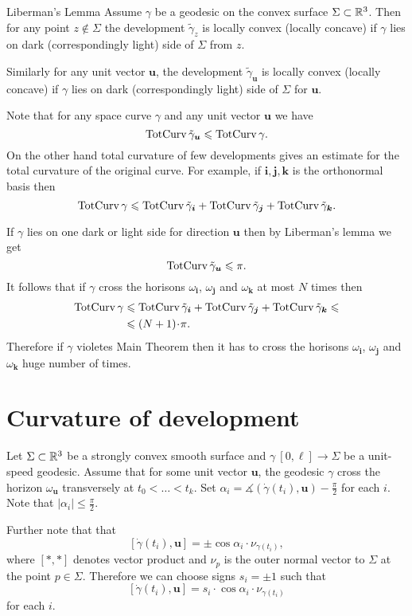 \documentclass[a4paper,10pt]{amsart}
\begin{document}
\begin{thm}{Liberman's Lemma}\label{lem:liberman}
Assume $\gamma$ be a geodesic on the convex surface $\Sigma\subset \mathbb{R}^3$.
Then for any point $z\notin\Sigma$ the development $\tilde\gamma_z$ is locally convex (locally concave) if $\gamma$ lies on dark (correspondingly light) side of $\Sigma$ from $z$.

Similarly for any unit vector $\bm{u}$,
the development $\tilde\gamma_{\bm{u}}$ is locally convex (locally concave) if $\gamma$ lies on dark (correspondingly light) side of $\Sigma$ for $\bm{u}$.

\end{thm}

Note that for any space curve $\gamma$ and any unit vector $\bm{u}$
we have 
\[\mathop{\rm TotCurv}\nolimits\tilde\gamma_{\bm{u}}\leqslant\mathop{\rm TotCurv}\nolimits\gamma.\]
On the other hand total curvature of few developments gives an estimate 
for the total curvature of the original curve.
For example, if $\bm{i},\bm{j},\bm{k}$ is the orthonormal basis then
\[\mathop{\rm TotCurv}\nolimits\gamma
\leqslant
\mathop{\rm TotCurv}\nolimits\tilde\gamma_{\bm{i}}+\mathop{\rm TotCurv}\nolimits\tilde\gamma_{\bm{j}}+\mathop{\rm TotCurv}\nolimits\tilde\gamma_{\bm{k}}.\]

If $\gamma$ lies on one dark or light side for direction $\bm{u}$
then by Liberman's lemma we get 
\[\mathop{\rm TotCurv}\nolimits\tilde\gamma_{\bm{u}}\leqslant \pi.\]
It follows that if $\gamma$ cross the horisons $\omega_{\bm{i}}$, $\omega_{\bm{j}}$ and $\omega_{\bm{k}}$
at most $N$ times then 
\begin{align*}
\tc\gamma
&\le
\tc\tilde\gamma_{\bm{i}}
+\tc\tilde\gamma_{\bm{j}}
+\tc\tilde\gamma_{\bm{k}}
\le
\\
&\le(N+1)\cdot \pi.
\end{align*}
Therefore if $\gamma$ violetes Main Theorem then it has to cross the  horisons $\omega_{\bm{i}}$, $\omega_{\bm{j}}$ and $\omega_{\bm{k}}$ huge number of times.

\section{Curvature of development}

Let $\Sigma\subset\mathbb{R}^3$
be a strongly convex smooth surface
and $\gamma\:[0,\ell]\to \Sigma$ be a unit-speed geodesic.
Assume that for some unit vector $\bm{u}$,
the geodesic $\gamma$ cross the horizon $\omega_{\bm{u}}$ transversely at 
$t_0<\dots <t_k$.
Set $\alpha_i=\measuredangle(\dot\gamma(t_i),\bm{u})-\tfrac\pi2$ for each $i$.
Note that $|\alpha_i|\le\tfrac\pi2$.


Further note that that 
\[[\dot\gamma(t_i),\bm{u}]=\pm\cos\alpha_i\cdot\nu_{\gamma(t_i)},
\]
where $[{*},{*}]$ denotes vector product 
and $\nu_p$ is the outer normal vector to $\Sigma$ at the point $p\in\Sigma$.
Therefore we can choose signs $s_i=\pm1$
such that 
\[[\dot\gamma(t_i),\bm{u}]=s_i\cdot\cos\alpha_i\cdot\nu_{\gamma(t_i)}
\]
for each $i$.
\end{document}
